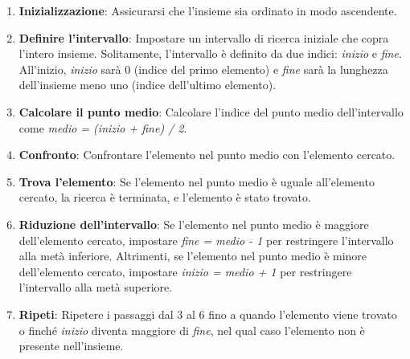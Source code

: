 \begin{enumerate}
  \item \textbf{Inizializzazione}: Assicurarsi che l'insieme sia ordinato in modo ascendente.

  \item \textbf{Definire l'intervallo}: Impostare un intervallo di ricerca iniziale che copra l'intero insieme. Solitamente, l'intervallo è definito da due indici: \textit{inizio} e \textit{fine}. All'inizio, \textit{inizio} sarà 0 (indice del primo elemento) e \textit{fine} sarà la lunghezza dell'insieme meno uno (indice dell'ultimo elemento).

  \item \textbf{Calcolare il punto medio}: Calcolare l'indice del punto medio dell'intervallo come \textit{medio = (inizio + fine) / 2}.

  \item \textbf{Confronto}: Confrontare l'elemento nel punto medio con l'elemento cercato.

  \item \textbf{Trova l'elemento}: Se l'elemento nel punto medio è uguale all'elemento cercato, la ricerca è terminata, e l'elemento è stato trovato.

  \item \textbf{Riduzione dell'intervallo}: Se l'elemento nel punto medio è maggiore dell'elemento cercato, impostare \textit{fine = medio - 1} per restringere l'intervallo alla metà inferiore. Altrimenti, se l'elemento nel punto medio è minore dell'elemento cercato, impostare \textit{inizio = medio + 1} per restringere l'intervallo alla metà superiore.

  \item \textbf{Ripeti}: Ripetere i passaggi dal 3 al 6 fino a quando l'elemento viene trovato o finché \textit{inizio} diventa maggiore di \textit{fine}, nel qual caso l'elemento non è presente nell'insieme.
\end{enumerate}



